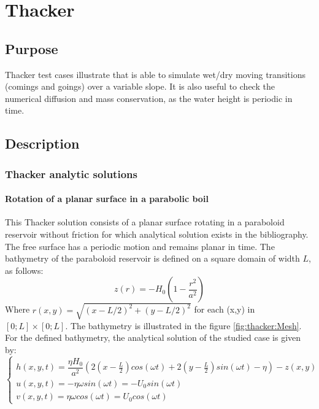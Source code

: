 \chapter{Thacker}
%
\section{Purpose}
Thacker test cases illustrate that  is able to simulate wet/dry moving transitions
(comings and goings) over a variable slope.
It is also useful to check the numerical diffusion and mass conservation, as the water height is periodic in time.

\section{Description}

\subsection{Thacker analytic solutions}

\subsubsection{Rotation of a planar surface in a parabolic boil}

This Thacker solution consists of a planar surface rotating in a paraboloid reservoir without friction for which analytical solution exists in the bibliography.
The free surface has a periodic motion and remains planar in time.
The bathymetry of the paraboloid reservoir is defined on a square domain of width $L$, as follows:
\begin{equation}
  z(r) = -H_0\left(1-\dfrac{r^2}{a^2}\right)
\end{equation}
Where $r(x,y) = \sqrt{(x-L/2)^2 + (y-L/2)^2}$ for each (x,y) in $[0;L] \times [0;L]$.
The bathymetry is illustrated in the figure \ref{fig:thacker:Mesh}.
For the defined bathymetry, the analytical solution of the studied case is given by:
\begin{equation}
  \left\{
    \begin{array}{ll}
        h(x,y,t) = \dfrac{\eta H_0}{a^2} \left(2 \left( x - \frac{L}{2} \right) cos(\omega t) + 2 \left( y - \frac{L}{2} \right) sin(\omega t) - \eta \right) - z(x,y) \\
        u(x,y,t) = - \eta \omega sin(\omega t) = -U_0 sin(\omega t)\\
        v(x,y,t) =  \eta \omega cos(\omega t) = U_0 cos(\omega t)
    \end{array}
    \right.
    \label{eq:thacker:analytical}
\end{equation}

